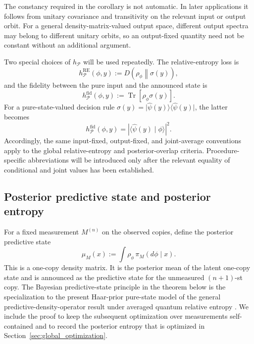 \documentclass[journal]{IEEEtran}
\newcommand{\ket}[1]{\lvert #1\rangle}
\newcommand{\bra}[1]{\langle #1\rvert}
\begin{document}
The constancy required in the corollary is not automatic.  In later
applications it follows from unitary covariance and transitivity on the
relevant input or output orbit.  For a general density-matrix-valued output
space, different output spectra may belong to different unitary orbits, so an
output-fixed quantity need not be constant without an additional argument.

Two special choices of \(h_{\mathcal P}\) will be used repeatedly.  The
relative-entropy loss is
\begin{equation}
    h_{\mathcal P}^{\mathrm{RE}}(\phi,y)
    :=
    D\!\left(\rho_\phi\middle\|\sigma(y)\right),
    \label{eq:procedure_relative_entropy_performance_function}
\end{equation}
and the fidelity between the pure input and the announced state is
\begin{equation}
    h_{\mathcal P}^{\mathrm{fid}}(\phi,y)
    :=
    \operatorname{Tr}\!\left[\rho_\phi\sigma(y)\right].
    \label{eq:procedure_fidelity_performance_function}
\end{equation}
For a pure-state-valued decision rule
\(\sigma(y)=\ket{\widehat\psi(y)}\bra{\widehat\psi(y)}\), the latter becomes
\begin{equation}
    h_{\mathcal P}^{\mathrm{fid}}(\phi,y)
    =
    \left|\langle\widehat\psi(y)\mid\phi\rangle\right|^2.
    \label{eq:procedure_fidelity_pure_output_form}
\end{equation}
Accordingly, the same input-fixed, output-fixed, and joint-average conventions
apply to the global relative-entropy and posterior-overlap criteria.
Procedure-specific abbreviations will be introduced only after the relevant
equality of conditional and joint values has been established.


\subsection{Posterior predictive state and posterior entropy}
\label{subsec:posterior_predictive_state}
\label{subsec:bayes_act_fixed_measurement}
\label{subsec:posterior_entropy_risk}
For a fixed measurement \(M^{(n)}\) on the observed copies, define the posterior
predictive state
\[
    \mu_M(x)
    :=
    \int \rho_\phi\,\pi_M(d\phi\mid x).
\]
This is a one-copy density matrix.  It is the posterior mean of the latent
one-copy state and is announced as the predictive state for the unmeasured
\((n+1)\)-st copy.  The Bayesian predictive-state principle in the theorem
below is the specialization to the present Haar-prior pure-state model of the
general predictive-density-operator result under averaged quantum relative
entropy \cite{TanakaKomaki2005BayesianPredictive}.  We include the proof to keep
the subsequent optimization over measurements self-contained and to record the
posterior entropy that is optimized in Section~\ref{sec:global_optimization}.
\end{document}
